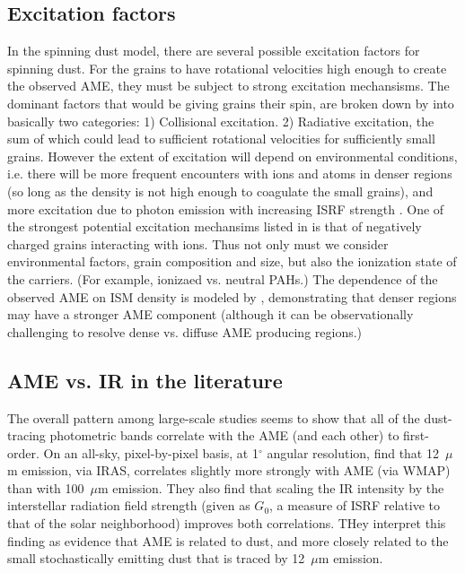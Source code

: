 \begin{center}
     \subsection{Excitation factors}
       In the spinning dust model, there are several possible excitation factors for spinning dust. For the grains to have rotational velocities high enough to create the observed AME, they must be subject to strong excitation mechansisms. The dominant factors that would be giving grains their spin, are broken down by \cite{draine11} into basically two categories: 1) Collisional excitation. 2) Radiative excitation, the sum of which could lead to sufficient rotational velocities for sufficiently small grains. However the extent of excitation will depend on environmental conditions, i.e. there will be more frequent encounters with ions and atoms in denser regions (so long as the density is not high enough to coagulate the small grains), and more excitation due to photon emission with increasing ISRF strength \citep{ali-haimoud09, ali-haimoud14}. One of the strongest potential excitation mechansims listed in \cite{draine11} is that of negatively charged grains interacting with ions. Thus not only must we consider environmental factors, grain composition and size, but also the ionization state of the carriers. (For example, ionizaed vs. neutral PAHs.) The dependence of the observed AME on ISM density is modeled by \cite{ali-haimoud10}, demonstrating that denser regions may have a stronger AME component (although it can be observationally challenging to resolve dense vs. diffuse AME producing regions.)

       \subsection{AME vs. IR in the literature}
          The overall pattern among large-scale studies seems to show that all of the dust-tracing photometric bands correlate with the AME (and each other) to first-order.  On an all-sky, pixel-by-pixel basis, at 1$^{\circ}$ angular resolution, \cite{ysard10b} find that 12~$\mu$m emission, via IRAS, correlates slightly more strongly with AME (via WMAP) than with 100~$\mu$m emission.  They also find that scaling the IR intensity by the interstellar radiation field strength (given as $G_0$, a measure of ISRF relative to that of the solar neighborhood) improves both correlations. THey interpret this finding as evidence that AME is related to dust, and more closely related to the small stochastically emitting dust that is traced by 12~$\mu$m emission.


\end{center}
